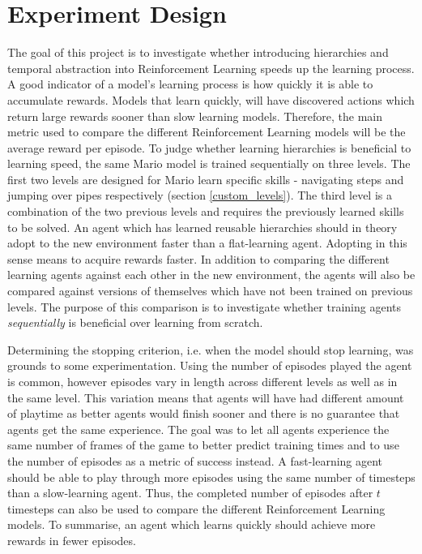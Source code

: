 \documentclass[notitlepage,a4paper,11pt]{article}
\begin{document}
\section{Experiment Design}
The goal of this project is to investigate whether introducing hierarchies and temporal abstraction into Reinforcement Learning speeds up the learning process. A good indicator of a model's learning process is how quickly it is able to accumulate rewards. Models that learn quickly, will have discovered actions which return large rewards sooner than slow learning models. Therefore, the main metric used to compare the different Reinforcement Learning models will be the average reward per episode. To judge whether learning hierarchies is beneficial to learning speed, the same Mario model is trained sequentially on three levels. The first two levels are designed for Mario learn specific skills - navigating steps and jumping over pipes respectively (section \ref{custom_levels}). The third level is a combination of the two previous levels and requires the previously learned skills to be solved. An agent which has learned reusable hierarchies should in theory adopt to the new environment faster than a flat-learning agent. Adopting in this sense means to acquire rewards faster. In addition to comparing the different learning agents against each other in the new environment, the agents will also be compared against versions of themselves which have not been trained on previous levels. The purpose of this comparison is to investigate whether training agents \textit{sequentially} is beneficial over learning from scratch.

Determining the stopping criterion, i.e. when the model should stop learning, was grounds to some experimentation. Using the number of episodes played the agent is common, however episodes vary in length across different levels as well as in the same level. This variation means that agents will have had different amount of playtime as better agents would finish sooner and there is no guarantee that agents get the same experience. The goal was to let all agents experience the same number of frames of the game to better predict training times and to use the number of episodes as a metric of success instead. A fast-learning agent should be able to play through more episodes using the same number of timesteps than a slow-learning agent. Thus, the completed number of episodes after $t$ timesteps can also be used to compare the different Reinforcement Learning models. To summarise, an agent which learns quickly should achieve more rewards in fewer episodes.
\end{document}
